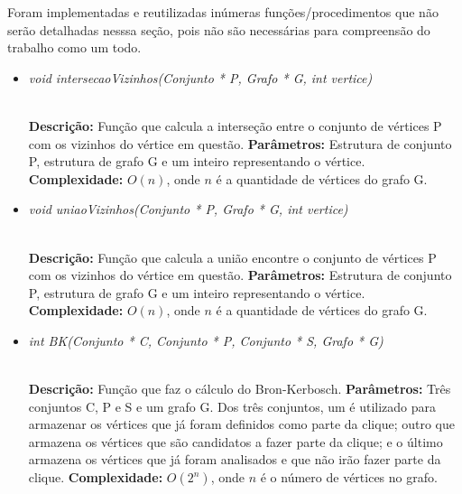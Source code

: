 \documentclass[12pt]{article}
\begin{document}
Foram implementadas e reutilizadas inúmeras funções/procedimentos que não serão detalhadas nesssa seção, pois não são necessárias para compreensão do trabalho como um todo.

\vspace{0.2 true cm}

\begin{itemize}
 \item \begin{large}\textit{void intersecaoVizinhos(Conjunto * P, Grafo * G, int vertice)}\end{large}\\
 \subitem \textbf{Descrição:} Função que calcula a interseção entre o conjunto de vértices P com os vizinhos do vértice em questão.
 \subitem \textbf{Parâmetros:} Estrutura de conjunto P, estrutura de grafo G e um inteiro representando o vértice.
 \subitem \textbf{Complexidade:} $O(n)$, onde $n$ é a quantidade de vértices do grafo G.
\end{itemize}

\vspace{0.2 true cm}

\begin{itemize}
 \item \begin{large}\textit{void uniaoVizinhos(Conjunto * P, Grafo * G, int vertice)}\end{large}\\
 \subitem \textbf{Descrição:} Função que calcula a união encontre o conjunto de vértices P com os vizinhos do vértice em questão.
 \subitem \textbf{Parâmetros:} Estrutura de conjunto P, estrutura de grafo G e um inteiro representando o vértice.
 \subitem \textbf{Complexidade:} $O(n)$, onde $n$ é a quantidade de vértices do grafo G.
\end{itemize}
\vspace{0.2 true cm}

\begin{itemize}
 \item \begin{large}\textit{int BK(Conjunto * C, Conjunto * P, Conjunto * S, Grafo * G)}\end{large}\\
 \subitem \textbf{Descrição:} Função que faz o cálculo do Bron-Kerbosch.
 \subitem \textbf{Parâmetros:} Três conjuntos C, P e S e um grafo G. Dos três conjuntos, um é utilizado para armazenar os vértices que já foram definidos como parte da clique; outro que armazena os vértices que são candidatos a fazer parte da clique; e o último armazena os vértices que já foram analisados e que não irão fazer parte da clique.
 \subitem \textbf{Complexidade:} $O(2^n)$, onde $n$ é o número de vértices no grafo.
\end{itemize}
\vspace{0.2 true cm}
\end{document}
